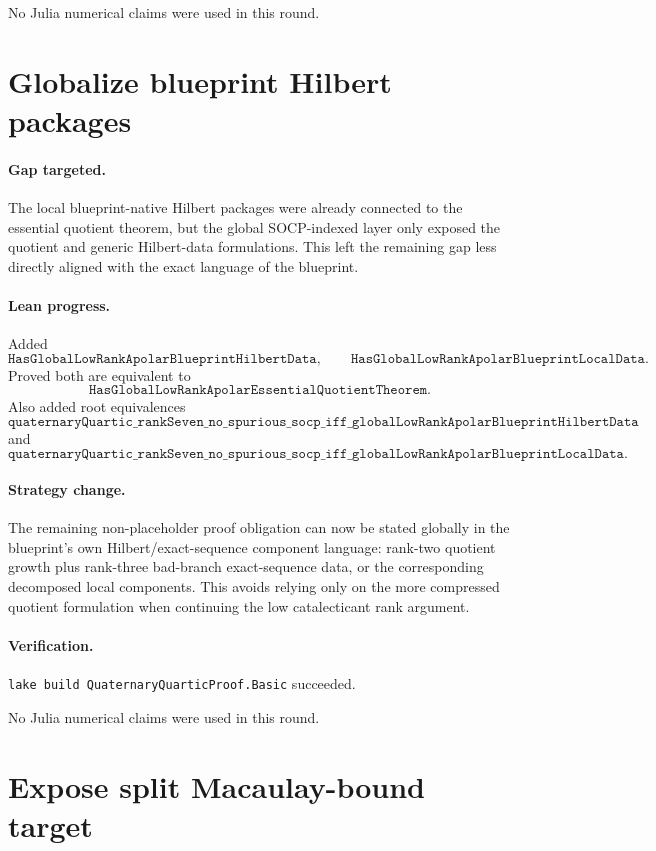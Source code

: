 \documentclass[11pt]{article}
\begin{document}
No Julia numerical claims were used in this round.

\section*{Globalize blueprint Hilbert packages}

\paragraph{Gap targeted.}
The local blueprint-native Hilbert packages were already connected to the
essential quotient theorem, but the global SOCP-indexed layer only exposed the
quotient and generic Hilbert-data formulations.  This left the remaining gap
less directly aligned with the exact language of the blueprint.

\paragraph{Lean progress.}
Added
\[
\texttt{HasGlobalLowRankApolarBlueprintHilbertData},
\qquad
\texttt{HasGlobalLowRankApolarBlueprintLocalData}.
\]
Proved both are equivalent to
\[
\texttt{HasGlobalLowRankApolarEssentialQuotientTheorem}.
\]
Also added root equivalences
\[
\texttt{quaternaryQuartic\_rankSeven\_no\_spurious\_socp\_iff\_globalLowRankApolarBlueprintHilbertData}
\]
and
\[
\texttt{quaternaryQuartic\_rankSeven\_no\_spurious\_socp\_iff\_globalLowRankApolarBlueprintLocalData}.
\]

\paragraph{Strategy change.}
The remaining non-placeholder proof obligation can now be stated globally in
the blueprint's own Hilbert/exact-sequence component language: rank-two
quotient growth plus rank-three bad-branch exact-sequence data, or the
corresponding decomposed local components.  This avoids relying only on the
more compressed quotient formulation when continuing the low catalecticant
rank argument.

\paragraph{Verification.}
\texttt{lake build QuaternaryQuarticProof.Basic} succeeded.

No Julia numerical claims were used in this round.

\section*{Expose split Macaulay-bound target}
\end{document}
